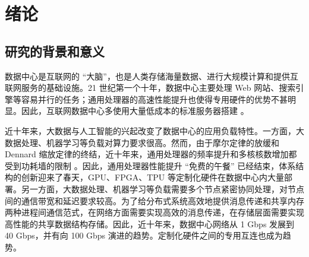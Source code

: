 \chapter{绪论}
\label{chapter:intro}

\section{研究的背景和意义}
\label{intro:sec:background}


数据中心是互联网的 ``大脑''，也是人类存储海量数据、进行大规模计算和提供互联网服务的基础设施。21 世纪第一个十年，数据中心主要处理 Web 网站、搜索引擎等容易并行的任务；通用处理器的高速性能提升也使得专用硬件的优势不甚明显。因此，互联网数据中心多使用大量低成本的标准服务器搭建 \cite{barroso2009datacenter}。

近十年来，大数据与人工智能的兴起改变了数据中心的应用负载特性。一方面，大数据处理、机器学习等负载对算力要求很高。然而，由于摩尔定律的放缓和 Dennard 缩放定律的终结，近十年来，通用处理器的频率提升和多核核数增加都受到功耗墙的限制 \cite{borkar2011future}。因此，通用处理器性能提升 ``免费的午餐'' 已经结束，体系结构的创新迎来了春天，GPU、FPGA、TPU \cite{jouppi2018motivation} 等定制化硬件在数据中心内大量部署。另一方面，大数据处理、机器学习等负载需要多个节点紧密协同处理，对节点间的通信带宽和延迟要求较高。为了给分布式系统高效地提供消息传递和共享内存两种进程间通信范式，在网络方面需要实现高效的消息传递，在存储层面需要实现高性能的共享数据结构存储。因此，近十年来，数据中心网络从 1 Gbps 发展到 40 Gbps，并有向 100 Gbps 演进的趋势。定制化硬件之间的专用互连也成为趋势。%


